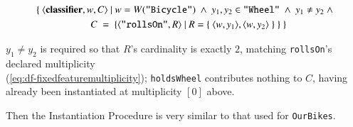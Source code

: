 \begin{gather}
\{~\langle \mathbf{classifier},w,C\rangle~\vert~w=W(\texttt{"Bicycle"})~\wedge~y_1,y_2\in\texttt{"Wheel"}~\wedge~y_1\neq y_2~\wedge \notag \\
~~~C~=~\{\langle \texttt{"rollsOn"},R\rangle~\vert~R=\{~\langle w,y_1\rangle,\langle w,y_2\rangle~\}~\}~\}
\label{eq:bicycle-rollson}
\end{gather}

$y_1\neq y_2$ is required so that $R$'s cardinality is exactly $2$, matching \texttt{rollsOn}'s declared
multiplicity \\(\ref{eq:df-fixedfeaturemultiplicity}); \texttt{holdsWheel} contributes nothing to $C$,
having already been instantiated at multiplicity $[0]$ above.

Then the Instantiation Procedure is very similar to that used for \texttt{OurBikes}.


